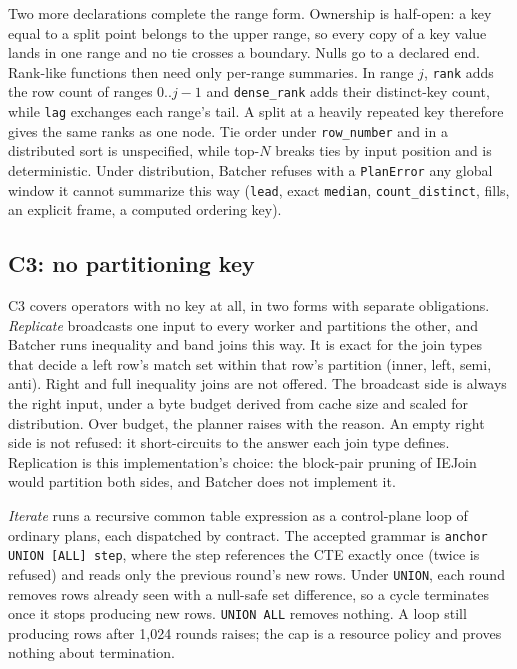 \documentclass[10pt,twocolumn,letterpaper]{article}   %
\newcommand{\sys}{Batcher}
\newcommand{\Cc}{\textsc{C3}}
\begin{document}
Two more declarations complete the range form. Ownership is half-open: a key equal to a split
point belongs to the upper range, so every copy of a key value lands in one range and no tie
crosses a boundary. Nulls go to a declared end. Rank-like functions then need only per-range
summaries. In range $j$, \texttt{rank} adds the row count of ranges $0..j{-}1$ and
\texttt{dense\_rank} adds their distinct-key count, while \texttt{lag} exchanges each range's
tail. A split at a heavily repeated key therefore gives the same ranks as one node. Tie order
under \texttt{row\_number} and in a distributed sort is unspecified, while top-$N$ breaks ties
by input position and is deterministic. Under distribution, \sys{} refuses with a
\texttt{PlanError} any global window it cannot summarize this way (\texttt{lead}, exact \texttt{median}, \texttt{count\_distinct},
fills, an explicit frame, a computed ordering key).

\subsection{\Cc{}: no partitioning key}

\Cc{} covers operators with no key at all, in two forms with separate obligations.
\emph{Replicate} broadcasts one input to every worker and partitions the other, and \sys{}
runs inequality and band joins this way. It is exact for the join types that decide a left
row's match set within that row's partition (inner, left, semi, anti). Right and full
inequality joins are not offered. The broadcast side is always the right input, under a byte
budget derived from cache size and scaled for distribution. Over budget, the planner raises
with the reason. An empty right side is not refused: it short-circuits to the answer each join
type defines. Replication is this implementation's choice: the block-pair pruning of
IEJoin~\cite{khayyat2015iejoin} would partition both sides, and \sys{} does not implement it.

\emph{Iterate} runs a recursive common table expression as a control-plane loop of ordinary
plans, each dispatched by contract. The accepted grammar is \texttt{anchor UNION [ALL] step},
where the step references the CTE exactly once (twice is refused) and reads only the previous
round's new rows.
Under \texttt{UNION}, each round removes rows already seen with a null-safe set difference, so
a cycle terminates once it stops producing new rows. \texttt{UNION ALL} removes nothing. A loop still producing rows after 1{,}024 rounds
raises; the cap is a resource policy and proves nothing about termination.
\end{document}
